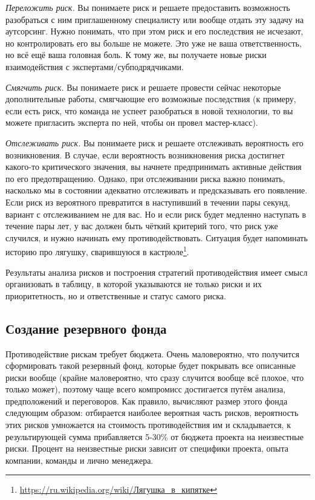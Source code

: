 \documentclass{../../text-style}
\begin{document}
\emph{Переложить риск.} Вы понимаете риск и решаете предоставить возможность разобраться с ним приглашенному специалисту или вообще отдать эту задачу на аутсорсинг. Нужно понимать, что при этом риск и его последствия не исчезают, но контролировать его вы больше не можете. Это уже не ваша ответственность, но всё ещё ваша головная боль. К тому же, вы получаете новые риски взаимодействия с экспертами/субподрядчиками.

\emph{Смягчить риск.} Вы понимаете риск и решаете провести сейчас некоторые дополнительные работы, смягчающие его возможные последствия (к примеру, если есть риск, что команда не успеет разобраться в новой технологии, то вы можете пригласить эксперта по ней, чтобы он провел мастер-класс).

\emph{Отслеживать риск.} Вы понимаете риск и решаете отслеживать вероятность его возникновения. В случае, если вероятность возникновения риска достигнет какого-то критического значения, вы начнете предпринимать активные действия по его предотвращению. Однако, при отслеживании риска важно понимать, насколько мы в состоянии адекватно отслеживать и предсказывать его появление. Если риск из вероятного превратится в наступивший в течении пары секунд, вариант с отслеживанием не для вас. Но и если риск будет медленно наступать в течение пары лет, у вас должен быть чёткий критерий того, что риск уже случился, и нужно начинать ему противодействовать. Ситуация будет напоминать историю про лягушку, сварившуюся в кастрюле\footnote{\url{https://ru.wikipedia.org/wiki/Лягушка_в_кипятке}}.

Результаты анализа рисков и построения стратегий противодействия имеет смысл организовать в таблицу, в которой указываются не только риски и их приоритетность, но и ответственные и статус самого риска.

\subsection{Создание резервного фонда}

Противодействие рискам требует бюджета. Очень маловероятно, что получится сформировать такой резервный фонд, которые будет покрывать все описанные риски вообще (крайне маловероятно, что сразу случится вообще всё плохое, что только может), поэтому чаще всего компромисс достигается путём анализа, предположений и переговоров. Как правило, вычисляют размер этого фонда следующим образом: отбирается наиболее вероятная часть рисков, вероятность этих рисков умножается на стоимость противодействия им и складывается, к результирующей сумма прибавляется 5-30\% от бюджета проекта на неизвестные риски. Процент на неизвестные риски зависит от специфики проекта, опыта компании, команды и лично менеджера. 
\end{document}
